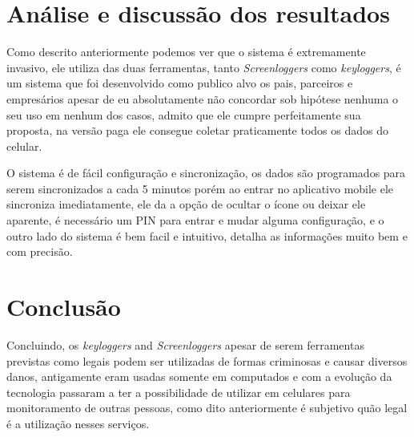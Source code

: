 \documentclass[12pt]{article}
\begin{document}
\section{Análise e discussão dos resultados}

Como descrito anteriormente podemos ver que o sistema é extremamente invasivo, ele utiliza das duas ferramentas, tanto  \textit{Screenloggers} como \textit{keyloggers}, é um sistema que foi desenvolvido como publico alvo os pais, parceiros e empresários apesar de eu absolutamente não concordar sob hipótese nenhuma o seu uso em nenhum dos casos, admito que ele cumpre perfeitamente sua proposta, na versão paga ele consegue coletar praticamente todos os dados do celular.

O sistema é de fácil configuração e sincronização, os dados são programados para serem sincronizados a cada 5 minutos porém ao entrar no aplicativo mobile ele sincroniza imediatamente, ele da a opção de ocultar o ícone ou deixar ele aparente, é necessário um PIN para entrar e mudar alguma configuração, e o outro lado do sistema é bem facil e intuitivo, detalha as informações muito bem e com precisão.
\section{Conclusão}

Concluindo, os \textit{keyloggers} and \textit {Screenloggers} apesar de serem ferramentas previstas como legais podem ser utilizadas de formas criminosas e causar diversos danos, antigamente eram usadas somente em computados e com a evolução da tecnologia passaram a ter a possibilidade de utilizar em celulares para monitoramento de outras pessoas, como dito anteriormente é subjetivo quão legal é a utilização nesses serviços.

\newpage
\nocite{*}




\end{document}
